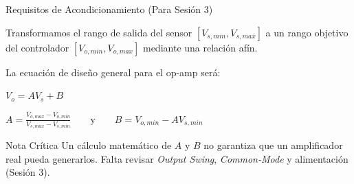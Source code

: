 \documentclass[aspectratio=169, xcolor={table,xcdraw}]{beamer}
\begin{document}
\begin{frame}{Requisitos de Acondicionamiento (Para Sesión 3)}
    \begin{tcolorbox}[colback=white, colframe=ucbblue, title=V8: Especificaciones de Rango]
        Transformamos el rango de salida del sensor $[V_{s,min}, V_{s,max}]$ a un rango objetivo del controlador $[V_{o,min}, V_{o,max}]$ mediante una relación afín.
    \end{tcolorbox}
    
    \vspace{0.2cm}
    La ecuación de diseño general para el op-amp será: 
    
    \vspace{0.2cm}
    {\centering $\displaystyle V_o = A V_s + B$ \par}
    
    \vspace{0.4cm}
    {\centering $\displaystyle A = \frac{V_{o,max} - V_{o,min}}{V_{s,max} - V_{s,min}} \qquad \text{y} \qquad B = V_{o,min} - A V_{s,min}$ \par}
    
    \vspace{0.4cm}
    \begin{alertblock}{Nota Crítica}
        \scriptsize Un cálculo matemático de $A$ y $B$ no garantiza que un amplificador real pueda generarlos. Falta revisar \textit{Output Swing}, \textit{Common-Mode} y alimentación (Sesión 3).
    \end{alertblock}
\end{frame}
\end{document}
